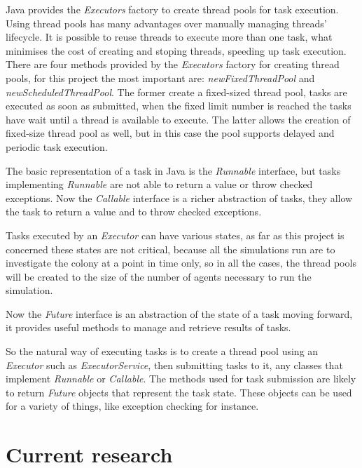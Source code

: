 Java provides the \emph{Executors} factory to create thread pools for task execution. Using thread pools has many advantages over manually managing threads' lifecycle. It is possible to reuse threads to execute more than one task, what minimises the cost of creating and stoping threads, speeding up task execution. There are four methods provided by the \emph{Executors} factory for creating thread pools, for this project the most important are: \emph{newFixedThreadPool} and \emph{newScheduledThreadPool}. The former create a fixed-sized thread pool, tasks are executed as soon as submitted, when the fixed limit number is reached the tasks have wait until a thread is available to execute. The latter allows the creation of fixed-size thread pool as well, but in this case the pool supports delayed and periodic task execution.

The basic representation of a task in Java is the \emph{Runnable} interface, but tasks implementing \emph{Runnable} are not able to return a value or throw checked exceptions.\cite{goetz2006java} Now the \emph{Callable} interface is a richer abstraction of tasks, they allow the task to return a value and to throw checked exceptions. 

Tasks executed by an \emph{Executor} can have various states, as far as this project is concerned these states are not critical, because all the simulations run are to investigate the colony at a point in time only, so in all the cases, the thread pools will be created to the size of the number of agents necessary to run the simulation.

Now the \emph{Future} interface is an abstraction of the state of a task moving forward, it provides useful methods to manage and retrieve results of tasks.

So the natural way of executing tasks is to create a thread pool using an \emph{Executor} such as \emph{ExecutorService}, then submitting tasks to it, any classes that implement \emph{Runnable} or \emph{Callable}. The methods used for task submission are likely to return \emph{Future} objects that represent the task state. These objects can be used for a variety of things, like exception checking for instance.

\section{Current research}
